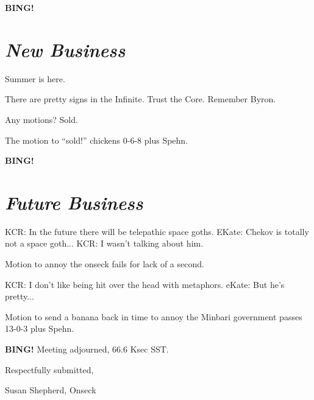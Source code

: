 \documentclass[10pt]{article}
\newcommand{\bing}{{\bf BING!} }
\newcommand{\goto}[1]{\bing \vskip 12pt \section*{{\em{#1}}}}
\newcommand{\ps}{ plus Spehn\xspace}
\begin{document}
\goto{New Business}

Summer is here.

There are pretty signs in the Infinite. Trust the Core. Remember Byron.

Any motions? Sold.

The motion to ``sold!'' chickens 0-6-8\ps.

\goto{Future Business}

KCR: In the future there will be telepathic space goths.
EKate: Chekov is totally not a space goth...
KCR: I wasn't talking about him.

Motion to annoy the onseck fails for lack of a second.

KCR: I don't like being hit over the head with metaphors.
eKate: But he's pretty...

Motion to send a banana back in time to annoy the Minbari government passes 13-0-3\ps.

\bing
\noindent
Meeting adjourned, 66.6 Ksec SST.

\vspace{18pt}

\centerline{Respectfully submitted,}
\centerline{Susan Shepherd, Onseck}
\end{document}
